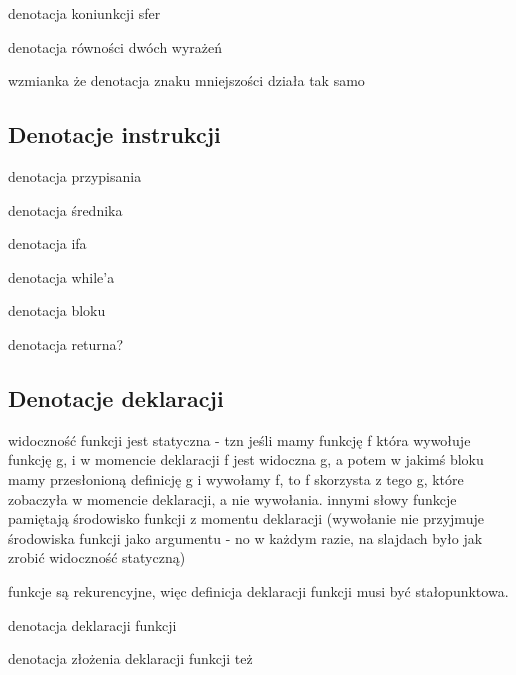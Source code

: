 \documentclass[a4paper]{article}
\begin{document}
denotacja koniunkcji sfer

denotacja równości dwóch wyrażeń

wzmianka że denotacja znaku mniejszości działa tak samo

\subsection*{Denotacje instrukcji}

denotacja przypisania

denotacja średnika

denotacja ifa

denotacja while'a

denotacja bloku

denotacja returna?

\subsection*{Denotacje deklaracji}

widoczność funkcji jest statyczna - tzn jeśli mamy funkcję f która wywołuje funkcję g, i w momencie deklaracji f jest widoczna g, a potem w jakimś bloku mamy przesłonioną definicję g i wywołamy f, to f skorzysta z tego g, które zobaczyła w momencie deklaracji, a nie wywołania. innymi słowy funkcje pamiętają środowisko funkcji z momentu deklaracji (wywołanie nie przyjmuje środowiska funkcji jako argumentu - no w każdym razie, na slajdach było jak zrobić widoczność statyczną)

funkcje są rekurencyjne, więc definicja deklaracji funkcji musi być stałopunktowa.

denotacja deklaracji funkcji

denotacja złożenia deklaracji funkcji też
\end{document}
